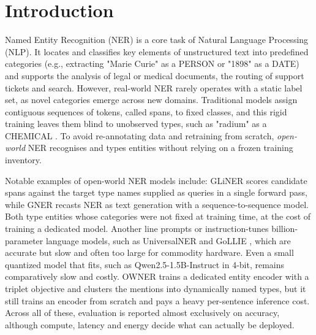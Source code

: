 \documentclass[pdflatex,sn-basic,Numbered]{sn-jnl}
\begin{document}

\maketitle

\section{Introduction}
\label{sec:introduction}

{
Named Entity Recognition (NER) is a core task of Natural Language Processing (NLP).
It locates and classifies key elements of unstructured text into predefined categories (e.g., extracting "Marie Curie" as a PERSON or "1898" as a DATE) and supports the analysis of legal or medical documents, the routing of support tickets and search.
However, real-world NER rarely operates with a static label set, as novel categories emerge across new domains.
Traditional models assign contiguous sequences of tokens, called spans, to fixed classes, and this rigid training leaves them blind to unobserved types, such as "radium" as a CHEMICAL \cite{nguyen2023span}.
To avoid re-annotating data and retraining from scratch, \emph{open-world} NER recognises and types entities without relying on a frozen training inventory.

Notable examples of open-world NER models include: GLiNER \cite{zaratiana2024gliner} scores candidate spans against the target type names supplied as queries in a single forward pass, while GNER \cite{ding2024gner} recasts NER as text generation with a sequence-to-sequence model. Both type entities whose categories were not fixed at training time, at the cost of training a dedicated model.
Another line prompts or instruction-tunes billion-parameter language models, such as UniversalNER \cite{zhou2024universalner} and GoLLIE \cite{sainz2024gollie}, which are accurate but slow and often too large for commodity hardware. Even a small quantized model that fits, such as Qwen2.5-1.5B-Instruct \cite{qwen2025} in 4-bit, remains comparatively slow and costly.
OWNER \cite{genest2025owner} trains a dedicated entity encoder with a triplet objective and clusters the mentions into dynamically named types, but it still trains an encoder from scratch and pays a heavy per-sentence inference cost.
Across all of these, evaluation is reported almost exclusively on accuracy, although compute, latency and energy decide what can actually be deployed.

}
\end{document}
